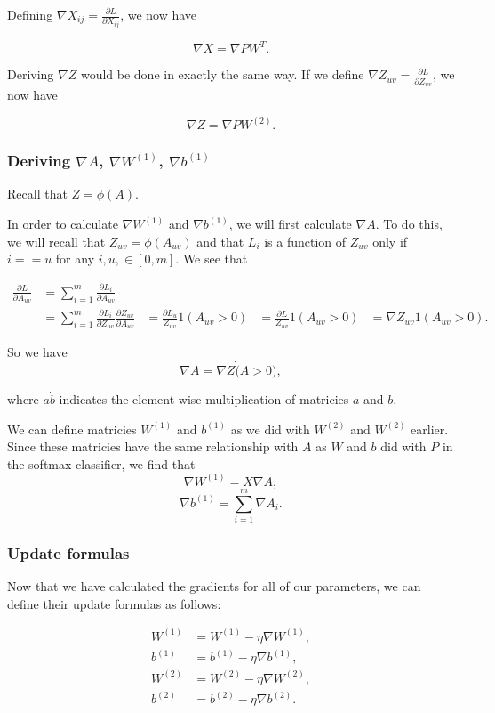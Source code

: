 Defining $\nabla X_{ij} = \frac{\partial L}{\partial X_{ij}}$, we now have

$$ \nabla X = \nabla P W^T. $$

Deriving $\nabla Z$ would be done in exactly the same way. If we define
$\nabla Z_{uv} = \frac{\partial L}{\partial Z_{uv}}$, we now have

$$ \nabla Z = \nabla P W^{(2)}. $$

\subsubsection{Deriving $\nabla A$, $\nabla W^{(1)}$, $\nabla b^{(1)}$}
Recall that $Z = \phi(A).$

In order to calculate $\nabla W^{(1)}$ and $\nabla b^{(1)}$, we will first
calculate $\nabla A$. To do this, we will recall that $Z_{uv} = \phi(A_{uv})$
and that $L_i$ is a function of $Z_{uv}$ only if $i == u$ for any $i, u, \in
[0, m]$. We see that

\begin{align*}
  \frac{\partial L}{\partial A_{uv}}
  &= \sum_{i=1}^m \frac{\partial L_i}{\partial A_{uv}}\\
  &= \sum_{i=1}^m \frac{\partial L_i}{\partial Z_{uv}} \frac{\partial Z_{uv}}{\partial A_{uv}}
  &= \frac{\partial L_u}{Z_{uv}} 1(A_{uv} > 0)
  &= \frac{\partial L}{Z_{uv}} 1(A_{uv} > 0)
  &= \nabla Z_{uv} 1(A_{uv} > 0).
\end{align*}

So we have
$$ \nabla A = \nabla Z \dot (A > 0), $$

where $a \dot b$ indicates the element-wise multiplication of matricies $a$ and $b$.

We can define matricies $W^{(1)}$ and $b^{(1)}$ as we did with $W^{(2)}$ and
$W^{(2)}$ earlier. Since these matricies have the same relationship with $A$ as
$W$ and $b$ did with $P$ in the softmax classifier, we find that
$$ \nabla W^{(1)} = X \nabla A, $$
$$ \nabla b^{(1)} = \sum_{i=1}^m \nabla A_i.$$

\subsubsection{Update formulas}
Now that we have calculated the gradients for all of our parameters, we can
define their update formulas as follows:

\begin{align*}
W^{(1)} &= W^{(1)} - \eta \nabla W^{(1)},\\
b^{(1)} &= b^{(1)} - \eta \nabla b^{(1)},\\
W^{(2)} &= W^{(2)} - \eta \nabla W^{(2)},\\
b^{(2)} &= b^{(2)} - \eta \nabla b^{(2)}.
\end{align*}

